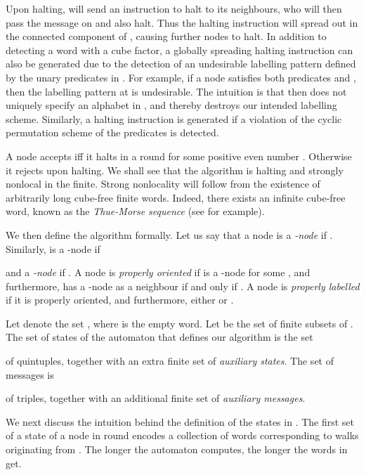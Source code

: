 \documentclass[copyright,creativecommons]{eptcs}
\begin{document}
Upon halting,  will send an instruction to
halt to its neighbours, who will then pass the message on and also halt. Thus the halting instruction
will spread out in the connected component of , causing further nodes to halt.
In addition to detecting a word with a cube factor, a globally spreading 
halting instruction can also be generated due to the detection of an undesirable
labelling pattern defined by the unary predicates in . For example, if a node 
satisfies both predicates  and , then the labelling pattern at 
is undesirable. The intuition is that then  does not uniquely specify an alphabet in ,
and thereby destroys our intended labelling scheme.
Similarly, a halting instruction is generated if a violation of the cyclic permutation scheme
of the predicates  is detected.




A node accepts iff it halts in a round  for some positive even number .
Otherwise it rejects upon halting.
We shall see that the algorithm is halting and strongly nonlocal in the finite.
Strong nonlocality will follow from the existence of arbitrarily long cube-free finite words.
Indeed, there exists an infinite cube-free word, known as the
\emph{Thue-Morse sequence} (see \cite{allouche} for example).




We then define the algorithm formally.
Let us say that a node 
is a \emph{-node} if .
Similarly,  is a \emph{}-node if

and a \emph{-node} if
.
A node  is \emph{properly oriented} if  is a -node for some ,
and furthermore,  has a -node as a neighbour if and only if .
A node  is \emph{properly labelled} if it is properly oriented, and furthermore, 
either  or .




Let  denote the set , where  is the empty word.
Let  be the set of finite subsets of .
The set of states of the automaton  that defines our algorithm is the set

of quintuples, together with an extra finite set  of \emph{auxiliary states}.
The set of messages is

of triples, together with an additional finite set  of \emph{auxiliary messages}.




We next discuss the intuition behind the definition of the states in .
The first set  of a state 
 of a node  in round  encodes a collection of words corresponding to
walks originating from .
The longer the automaton computes, the longer the words in  get.
\end{document}
